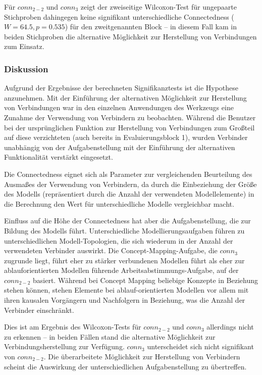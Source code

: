 Für $conn_{2-2}$ und $conn_{3}$ zeigt der zweiseitige Wilcoxon-Test für ungepaarte Stichproben dahingegen keine signifikant unterschiedliche Connectedness ($W=64.5, p=0.535$) für den zweitgenannten Block -- in diesem Fall kam in beiden Stichproben die alternative Möglichkeit zur Herstellung von Verbindungen zum Einsatz.

\subsubsection{Diskussion} %

Aufgrund der Ergebnisse der berechneten Signifikanztests ist die Hypothese anzunehmen. Mit der Einführung der alternativen Möglichkeit zur Herstellung von Verbindungen war in den einzelnen Anwendungen des Werkzeugs eine Zunahme der Verwendung von Verbindern zu beobachten. Während die Benutzer bei der ursprünglichen Funktion zur Herstellung von Verbindungen zum Großteil auf diese verzichteten (auch bereits in Evaluierungsblock 1), wurden Verbinder unabhängig von der Aufgabenstellung mit der Einführung der alternativen Funktionalität verstärkt eingesetzt.

Die Connectedness eignet sich als Parameter zur vergleichenden Beurteilung des Ausmaßes der Verwendung von Verbindern, da durch die Einbeziehung der Größe des Modells (repräsentiert durch die Anzahl der verwendeten Modellelemente) in die Berechnung den Wert für unterschiedliche Modelle vergleichbar macht. 

Einfluss auf die Höhe der Connectedness hat aber die Aufgabenstellung, die zur Bildung des Modells führt. Unterschiedliche Modellierungsaufgaben führen zu unterschiedlichen Modell-Topologien, die sich wiederum in der Anzahl der verwendeten Verbinder auswirkt. Die Concept-Mapping-Aufgabe, die $conn_{3}$ zugrunde liegt, führt eher zu stärker verbundenen Modellen führt als eher zur ablauforientierten Modellen führende Arbeitsabstimmungs-Aufgabe, auf der $conn_{2-2}$ basiert. Während bei Concept Mapping beliebige Konzepte in Beziehung stehen können, stehen Elemente bei ablauf-orientierten Modellen vor allem mit ihren kausalen Vorgängern und Nachfolgern in Beziehung, was die Anzahl der Verbinder einschränkt.

Dies ist am Ergebnis des Wilcoxon-Tests für $conn_{2-2}$ und $conn_{3}$ allerdings nicht zu erkennen -- in beiden Fällen stand die alternative Möglichkeit zur Verbindungsherstellung zur Verfügung. $conn_{3}$ unterscheidet sich nicht signifikant von $conn_{2-2}$. Die überarbeitete Möglichkeit zur Herstellung von Verbindern scheint die Auswirkung der unterschiedlichen Aufgabenstellung zu übertreffen.

